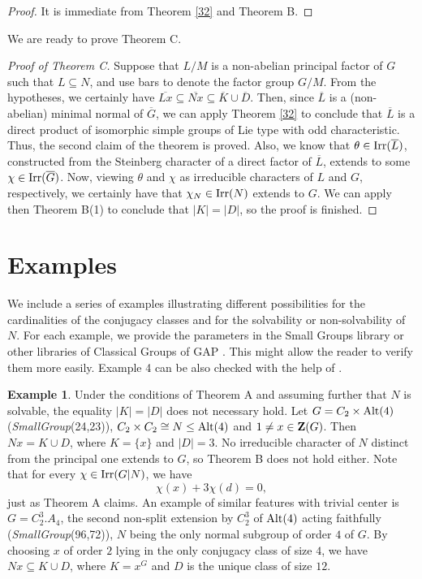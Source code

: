 \documentclass[12pt,leqno,a4paper]{amsart}
\numberwithin{equation}{section}
\begin{document}
\begin{proof}
It is immediate from Theorem \ref{32} and Theorem B.
\end{proof}


We are ready to prove  Theorem C.

\medskip
\begin{proof}[Proof of Theorem C]  Suppose that $L/M$ is a non-abelian principal factor of $G$ such that $L\subseteq N$, and use bars to denote the factor group $G/M$. From the hypotheses, we certainly have $\overline{Lx}\subseteq \overline{Nx}\subseteq \overline{K}\cup \overline{D}$. Then, since $\overline{L}$ is a (non-abelian) minimal normal of $\overline{G}$, we can apply Theorem \ref{32} to conclude that $\overline{L}$ is a direct product of isomorphic simple groups of Lie type with odd characteristic. Thus, the second claim of the theorem is proved. Also, we know   that  $\theta\in {\rm Irr}(\overline{L})$, constructed from the Steinberg character of a direct factor of $\overline{L}$, extends to some $\chi\in {\rm Irr}(\overline{G})$. Now, viewing $\theta$ and $\chi$ as irreducible characters of $L$ and $G$, respectively, we certainly have that $\chi_N\in {\rm Irr}(N)$  extends to $G$. We can apply  then  Theorem B(1) to conclude that $|K|=|D|$, so the proof is finished.
 \end{proof}

\section{Examples}

We include a series of examples illustrating  different possibilities for the cardinalities of the conjugacy classes and  for the solvability or non-solvability of $N$.  For each example, we  provide the parameters in  the Small Groups library or  other libraries of  Classical Groups of GAP \cite{GAP}. This might allow the reader to verify them more easily. Example 4 can be also checked with the help of \cite{atlas}.

\medskip
\noindent
{\bf Example 1}.  Under the  conditions of Theorem A and assuming further that $N$ is solvable, the equality $|K|=|D|$ does not necessary hold.  Let $G=C_2\times {\rm Alt}(4)$ ({\it SmallGroup}(24,23)), $C_2\times C_2\cong N\leq {\rm Alt}(4)$ and $1\neq x\in{\bf Z}(G)$. Then $Nx=K\cup D$, where $K=\{x\}$ and $|D|=3$. No irreducible character of $N$  distinct from the principal one extends to $G$, so Theorem B does not hold either. Note that for every $\chi\in{\rm Irr}(G|N)$, we have
 $$\chi(x)+ 3\chi(d)=0,$$
just as Theorem A claims. An example of similar features  with trivial center is $G=C_2^3.A_4$, the second non-split extension by $C_2^3$ of ${\rm Alt}(4)$ acting faithfully ({\it SmallGroup}(96,72)),  $N$ being the only normal subgroup of order $4$ of $G$. By choosing $x$ of order $2$ lying in the only conjugacy class of size $4$, we have $Nx\subseteq K \cup D$, where $K=x^G$ and $D$ is the unique class of size $12$. 
\end{document}
